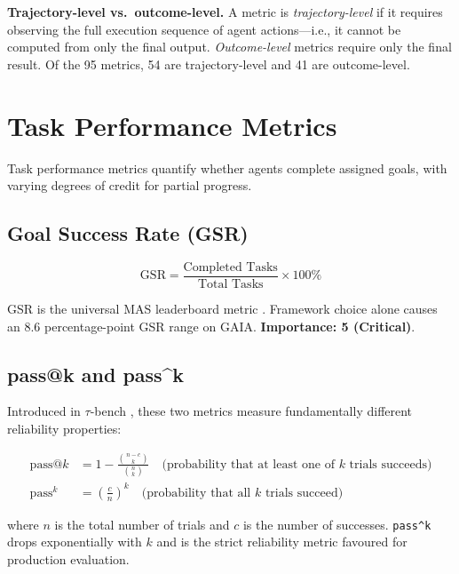 \documentclass[11pt,a4paper]{article}
\newcommand{\abbr}[1]{\texttt{#1}}
\begin{document}
\noindent\textbf{Trajectory-level vs.\ outcome-level.} A metric is
\emph{trajectory-level} if it requires observing the full execution sequence of agent
actions—i.e., it cannot be computed from only the final output. \emph{Outcome-level}
metrics require only the final result. Of the 95 metrics, 54 are trajectory-level and
41 are outcome-level.

\section{Task Performance Metrics}
\label{sec:task}

Task performance metrics quantify whether agents complete assigned goals, with varying
degrees of credit for partial progress.

\subsection{Goal Success Rate (GSR)}

\begin{equation}
  \text{GSR} = \frac{\text{Completed Tasks}}{\text{Total Tasks}} \times 100\%
\end{equation}

GSR is the universal MAS leaderboard metric \citep{maseval2025,gaia2023}. Framework
choice alone causes an 8.6 percentage-point GSR range on GAIA. \textbf{Importance: 5
(Critical)}.

\subsection{pass@k and pass\^{}k}

Introduced in $\tau$-bench \citep{tbench2024}, these two metrics measure fundamentally
different reliability properties:

\begin{align}
  \text{pass@}k &= 1 - \frac{\binom{n-c}{k}}{\binom{n}{k}} \quad
    \text{(probability that at least one of } k \text{ trials succeeds)} \\[4pt]
  \text{pass}^k &= \left(\frac{c}{n}\right)^k \quad
    \text{(probability that all } k \text{ trials succeed)}
\end{align}

\noindent where $n$ is the total number of trials and $c$ is the number of successes.
\abbr{pass\^{}k} drops exponentially with $k$ and is the strict reliability metric
favoured for production evaluation.
\end{document}
